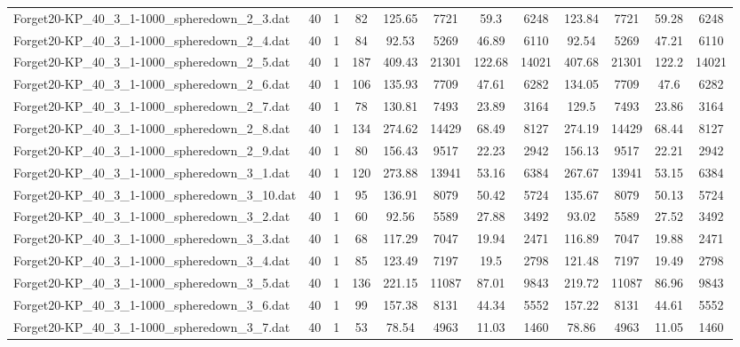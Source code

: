 \begin{sidewaystable}[!ht]
{\begin{tabular}{lccccccccccc}
Forget20-KP\_40\_3\_1-1000\_spheredown\_2\_3.dat & 40 & 1 & 82 & 125.65 & 7721 & 59.3 & 6248 & 123.84 & 7721 & 59.28 & 6248 \\
Forget20-KP\_40\_3\_1-1000\_spheredown\_2\_4.dat & 40 & 1 & 84 & 92.53 & 5269 & 46.89 & 6110 & 92.54 & 5269 & 47.21 & 6110 \\
Forget20-KP\_40\_3\_1-1000\_spheredown\_2\_5.dat & 40 & 1 & 187 & 409.43 & 21301 & 122.68 & 14021 & 407.68 & 21301 & 122.2 & 14021 \\
Forget20-KP\_40\_3\_1-1000\_spheredown\_2\_6.dat & 40 & 1 & 106 & 135.93 & 7709 & 47.61 & 6282 & 134.05 & 7709 & 47.6 & 6282 \\
Forget20-KP\_40\_3\_1-1000\_spheredown\_2\_7.dat & 40 & 1 & 78 & 130.81 & 7493 & 23.89 & 3164 & 129.5 & 7493 &  \textcolor{blue2}{23.86} & 3164 \\
Forget20-KP\_40\_3\_1-1000\_spheredown\_2\_8.dat & 40 & 1 & 134 & 274.62 & 14429 & 68.49 & 8127 & 274.19 & 14429 & 68.44 & 8127 \\
Forget20-KP\_40\_3\_1-1000\_spheredown\_2\_9.dat & 40 & 1 & 80 & 156.43 & 9517 & 22.23 & 2942 & 156.13 & 9517 & 22.21 & 2942 \\
Forget20-KP\_40\_3\_1-1000\_spheredown\_3\_1.dat & 40 & 1 & 120 & 273.88 & 13941 & 53.16 & 6384 & 267.67 & 13941 & 53.15 & 6384 \\
Forget20-KP\_40\_3\_1-1000\_spheredown\_3\_10.dat & 40 & 1 & 95 & 136.91 & 8079 & 50.42 & 5724 & 135.67 & 8079 & 50.13 & 5724 \\
Forget20-KP\_40\_3\_1-1000\_spheredown\_3\_2.dat & 40 & 1 & 60 & 92.56 & 5589 & 27.88 & 3492 & 93.02 & 5589 &  \textcolor{blue2}{27.52} & 3492 \\
Forget20-KP\_40\_3\_1-1000\_spheredown\_3\_3.dat & 40 & 1 & 68 & 117.29 & 7047 & 19.94 & 2471 & 116.89 & 7047 &  \textcolor{blue2}{19.88} & 2471 \\
Forget20-KP\_40\_3\_1-1000\_spheredown\_3\_4.dat & 40 & 1 & 85 & 123.49 & 7197 & 19.5 & 2798 & 121.48 & 7197 &  \textcolor{blue2}{19.49} & 2798 \\
Forget20-KP\_40\_3\_1-1000\_spheredown\_3\_5.dat & 40 & 1 & 136 & 221.15 & 11087 & 87.01 & 9843 & 219.72 & 11087 &  \textcolor{blue2}{86.96} & 9843 \\
Forget20-KP\_40\_3\_1-1000\_spheredown\_3\_6.dat & 40 & 1 & 99 & 157.38 & 8131 &  \textcolor{blue2}{44.34} & 5552 & 157.22 & 8131 & 44.61 & 5552 \\
Forget20-KP\_40\_3\_1-1000\_spheredown\_3\_7.dat & 40 & 1 & 53 & 78.54 & 4963 &  \textcolor{blue2}{11.03} & 1460 & 78.86 & 4963 & 11.05 & 1460 \\

\end{tabular}}
\end{sidewaystable}
